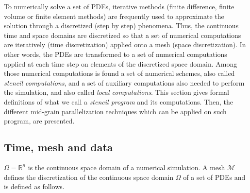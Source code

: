 To numerically solve a set of PDEs, iterative methods (finite difference, finite volume or finite element methods) are frequently used to approximate the solution through a discretized (step by step) phenomena. Thus, the continuous time and space domains are discretized so that a set of numerical computations are iteratively (time discretization) applied onto a mesh (space discretization). In other words, the PDEs are transformed to a set of numerical computations applied at each time step on elements of the discretized space domain. Among those numerical computations is found a set of numerical schemes, also called \textit{stencil computations}, and a set of auxiliary computations also needed to perform the simulation, and also called \emph{local computations}.
This section gives formal definitions of what we call a \textit{stencil program} and its computations. Then, the different mid-grain parallelization techniques which can be applied on such program, are presented.

\subsection{Time, mesh and data}

$\Omega=\mathbb{R}^n$ is the continuous space domain of a numerical simulation. %
A mesh $\mathcal{M}$ defines the discretization of the continuous space domain $\Omega$ of a set of PDEs and is defined as follows.

